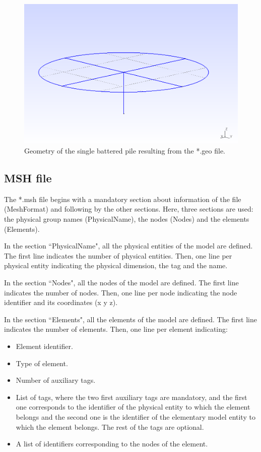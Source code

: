 \documentclass[a4]{article}
\begin{document}
\begin{figure}[h]
	\centering
	\includegraphics[scale = 0.58]{geometry.png}
	\caption{Geometry of the single battered pile resulting from the *.geo file.} 
	\label{fig:geometry_single_battered_pile}
\end{figure}

\subsection{MSH file}

The *.msh file begins with a mandatory section about information of the file (MeshFormat) and following by the other sections. Here, three sections are used: the physical group names (PhysicalName), the nodes (Nodes) and the elements (Elements).

In the section ``PhysicalName", all the physical entities of the model are defined. The first line indicates the number of physical entities. Then, one line per physical entity indicating the physical dimension, the tag and the name.  

In the section ``Nodes", all the nodes of the model are defined. The first line indicates the number of nodes. Then, one line per node indicating the node identifier and its coordinates (x y z).

In the section ``Elements", all the elements of the model are defined. The first line indicates the number of elements. Then, one line per element indicating:

\begin{itemize}
	\item Element identifier.
	\item Type of element.
	\item Number of auxiliary tags.
	\item List of tags, where the two first auxiliary tags are mandatory, and the first one corresponds to the identifier of the physical entity to which the element belongs and the second one is the identifier of the elementary model entity to which the element belongs. The rest of the tags are optional.
	\item A list of identifiers corresponding to the nodes of the element.
\end{itemize}
\end{document}
